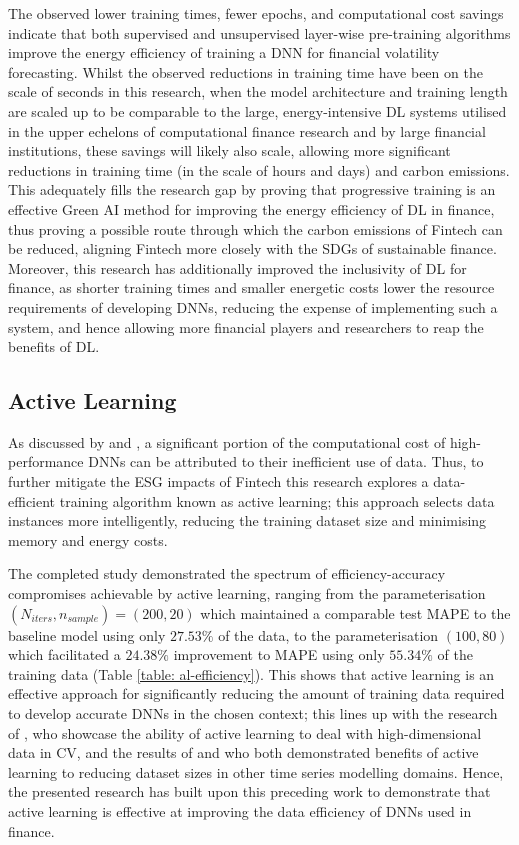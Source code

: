 \documentclass[a4paper, 11pt]{report}
\begin{document}
    The observed lower training times, fewer epochs, and computational cost savings indicate that both supervised and unsupervised layer-wise pre-training algorithms improve the energy efficiency of training a DNN for financial volatility forecasting. Whilst the observed reductions in training time have been on the scale of seconds in this research, when the model architecture and training length are scaled up to be comparable to the large, energy-intensive DL systems utilised in the upper echelons of computational finance research and by large financial institutions, these savings will likely also scale, allowing more significant reductions in training time (in the scale of hours and days) and carbon emissions. This adequately fills the research gap by proving that progressive training is an effective Green AI method for improving the energy efficiency of DL in finance, thus proving a possible route through which the carbon emissions of Fintech can be reduced, aligning Fintech more closely with the SDGs of sustainable finance. Moreover, this research has additionally improved the inclusivity of DL for finance, as shorter training times and smaller energetic costs lower the resource requirements of developing DNNs, reducing the expense of implementing such a system, and hence allowing more financial players and researchers to reap the benefits of DL.


    \subsection{Active Learning}

    As discussed by \citet{bender-2021} and \citet{walsh-2021}, a significant portion of the computational cost of high-performance DNNs can be attributed to their inefficient use of data. Thus, to further mitigate the ESG impacts of Fintech this research explores a data-efficient training algorithm known as active learning; this approach selects data instances more intelligently, reducing the training dataset size and minimising memory and energy costs.

    The completed study demonstrated the spectrum of efficiency-accuracy compromises achievable by active learning, ranging from the parameterisation $(N_{iters}, n_{sample}) = (200, 20)$ which maintained a comparable test MAPE to the baseline model using only $27.53\%$ of the data, to the parameterisation $(100, 80)$ which facilitated a $24.38\%$ improvement to MAPE using only $55.34\%$ of the training data (Table \ref{table: al-efficiency}). This shows that active learning is an effective approach for significantly reducing the amount of training data required to develop accurate DNNs in the chosen context; this lines up with the research of \citet{ren-2021}, who showcase the ability of active learning to deal with high-dimensional data in CV, and the results of \citet{peng-2017} and \citet{zimmer-2018} who both demonstrated benefits of active learning to reducing dataset sizes in other time series modelling domains. Hence, the presented research has built upon this preceding work to demonstrate that active learning is effective at improving the data efficiency of DNNs used in finance.
\end{document}
